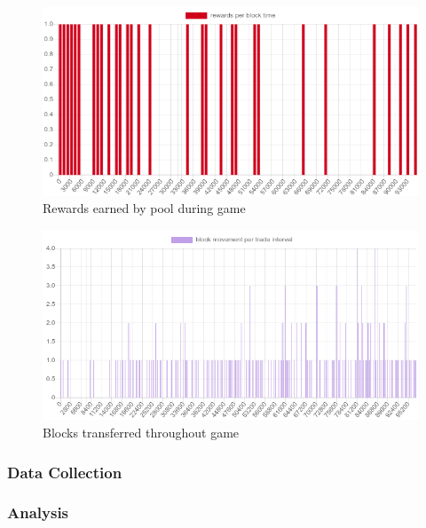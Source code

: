 \begin{figure}[H]
  \centering
  \caption{Rewards earned by pool during game}
  \label{figure:rewards}
  \includegraphics[width=\linewidth]{media/fig-rewards}
\end{figure}

\begin{figure}[H]
  \centering
  \caption{Blocks transferred throughout game}
  \label{figure:blocks}
  \includegraphics[width=\linewidth]{media/fig-blocks}
\end{figure}

\subsubsection{Data Collection}

\subsubsection{Analysis}

